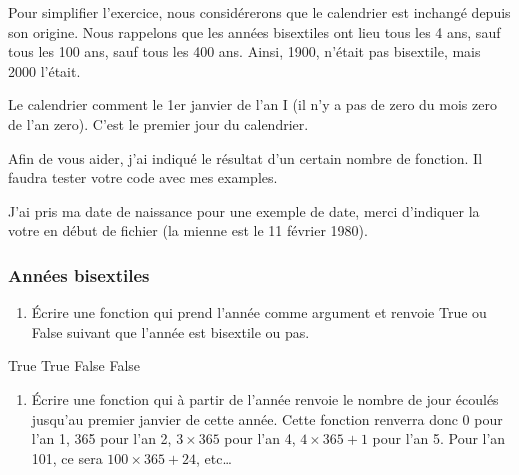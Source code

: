 \documentclass[letterpaper,10pt,english]{sphinxhowto}
\begin{document}
\sphinxAtStartPar
Pour simplifier l’exercice, nous considérerons que le calendrier est inchangé depuis son origine. Nous rappelons que les années bisextiles ont lieu tous les 4 ans, sauf tous les 100 ans, sauf tous les 400 ans. Ainsi, 1900, n’était pas bisextile, mais 2000 l’était.

\sphinxAtStartPar
Le calendrier comment le 1er janvier de l’an I (il n’y a pas de zero du mois zero de l’an zero). C’est le premier jour du calendrier.

\sphinxAtStartPar
Afin de vous aider, j’ai indiqué le résultat d’un certain nombre de fonction. Il faudra tester votre code avec mes examples.

\sphinxAtStartPar
J’ai pris ma date de naissance pour une exemple de date, merci d’indiquer la votre en début de fichier (la mienne est le 11 février 1980).


\subsubsection{Années bisextiles}
\label{\detokenize{devoir_maison_Devoir Maison:annees-bisextiles}}\begin{enumerate}
%
\item {} 
\sphinxAtStartPar
Écrire une fonction qui prend l’année comme argument et renvoie True ou False suivant que l’année est bisextile ou pas.

\end{enumerate}

\begin{sphinxVerbatim}[commandchars=\\\{\}]
\end{sphinxVerbatim}

\begin{sphinxVerbatim}[commandchars=\\\{\}]
True
True
False
False
\end{sphinxVerbatim}
\begin{enumerate}
%
\setcounter{enumi}{1}
\item {} 
\sphinxAtStartPar
Écrire une fonction qui à partir de l’année renvoie le nombre de jour écoulés jusqu’au premier janvier de cette année. Cette fonction renverra donc 0 pour l’an 1, 365 pour l’an 2, \(3\times365\) pour l’an 4, \(4\times365+1\) pour l’an 5. Pour l’an 101, ce sera \(100\times 365 + 24\), etc…

\end{enumerate}
\end{document}

